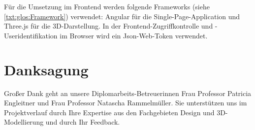 Für die Umsetzung im Frontend werden folgende Frameworks (siehe \ref{txt:glos:Framework}) verwendet: Angular für die Single-Page-Application und Three.js für die 3D-Darstellung. In der Frontend-Zugriffkontrolle und -Useridentifikation im Browser wird ein Json-Web-Token verwendet.

\chapter*{Danksagung}
Großer Dank geht an unsere Diplomarbeits-Betreuerinnen
Frau Professor Patricia Engleitner und Frau Professor Natascha Rammelmüller. Sie unterstützen uns im Projektverlauf durch Ihre Expertise aus den Fachgebieten Design und 3D-Modellierung und durch Ihr Feedback.
